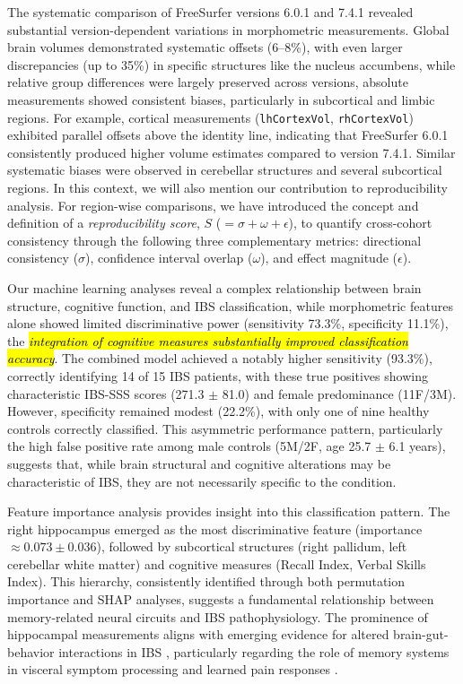\documentclass[diagnostics,article,accept,pdftex,moreauthors]{Definitions/mdpi}
\begin{document}
The systematic comparison of FreeSurfer versions 6.0.1 and 7.4.1 revealed substantial version-dependent variations in morphometric measurements. Global brain volumes demonstrated systematic offsets (6--8\%), with even larger discrepancies (up to 35\%) in specific structures like the nucleus accumbens, while relative group differences were largely preserved across versions, absolute measurements showed consistent biases, particularly in subcortical and limbic regions. For example, cortical measurements (\texttt{lhCortexVol}, \texttt{rhCortexVol}) exhibited parallel offsets above the identity line, indicating that FreeSurfer 6.0.1 consistently produced higher volume estimates compared to version 7.4.1. Similar systematic biases were observed in cerebellar structures and several subcortical regions. In this context, we will also mention our contribution to reproducibility analysis. For region-wise comparisons, we have introduced the concept and definition of a \textit{reproducibility score}, $S$ ($=\sigma+\omega+\epsilon$), to quantify cross-cohort consistency through the following three complementary metrics: directional consistency ($\sigma$), confidence interval overlap ($\omega$), and effect magnitude ($\epsilon$). 





Our machine learning analyses reveal a complex relationship between brain structure, cognitive function, and IBS classification, while morphometric features alone showed limited discriminative power (sensitivity 73.3\%, specificity 11.1\%), the \textit{\hl{integration of cognitive measures substantially improved classification accuracy}}. %
The combined model achieved a notably higher sensitivity (93.3\%), correctly identifying 14 of 15 IBS patients, with these true positives showing characteristic IBS-SSS scores (271.3 $\pm$ 81.0) and female predominance (11F/3M). However, specificity remained modest (22.2\%), with only one of nine healthy controls correctly classified. This asymmetric performance pattern, particularly the high false positive rate among male controls (5M/2F, age 25.7 $\pm$ 6.1 years), suggests that, while brain structural and cognitive alterations may be characteristic of IBS, they are not necessarily specific to the condition.

Feature importance analysis provides insight into this classification pattern. The right hippocampus emerged as the most discriminative feature (importance $\approx 0.073 \pm 0.036$), followed by subcortical structures (right pallidum, left cerebellar white matter) and cognitive measures (Recall Index, Verbal Skills Index). This hierarchy, consistently identified through both permutation importance and SHAP analyses, suggests a fundamental relationship between memory-related neural circuits and IBS pathophysiology. The prominence of hippocampal measurements aligns with emerging evidence for altered brain-gut-behavior interactions in IBS \cite{Mayer2022}, particularly regarding the role of memory systems in visceral symptom processing and learned pain responses \cite{duric2006persistent,icenhour2015neural}.
\end{document}
